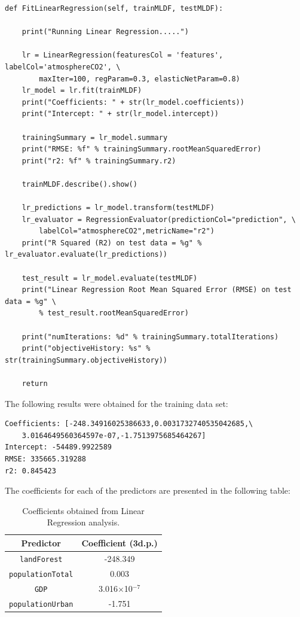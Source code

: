 \documentclass[11pt,a4paper,titlepage]{article}
\begin{document}
\begin{verbatim}
def FitLinearRegression(self, trainMLDF, testMLDF):

    print("Running Linear Regression.....")

    lr = LinearRegression(featuresCol = 'features', labelCol='atmosphereCO2', \
        maxIter=100, regParam=0.3, elasticNetParam=0.8)
    lr_model = lr.fit(trainMLDF)
    print("Coefficients: " + str(lr_model.coefficients))
    print("Intercept: " + str(lr_model.intercept))

    trainingSummary = lr_model.summary
    print("RMSE: %f" % trainingSummary.rootMeanSquaredError)
    print("r2: %f" % trainingSummary.r2)

    trainMLDF.describe().show()

    lr_predictions = lr_model.transform(testMLDF)
    lr_evaluator = RegressionEvaluator(predictionCol="prediction", \
        labelCol="atmosphereCO2",metricName="r2")
    print("R Squared (R2) on test data = %g" % lr_evaluator.evaluate(lr_predictions))

    test_result = lr_model.evaluate(testMLDF)
    print("Linear Regression Root Mean Squared Error (RMSE) on test data = %g" \
        % test_result.rootMeanSquaredError)

    print("numIterations: %d" % trainingSummary.totalIterations)
    print("objectiveHistory: %s" % str(trainingSummary.objectiveHistory))

    return
\end{verbatim}

The following results were obtained for the training data set:

\begin{verbatim}
Coefficients: [-248.34916025386633,0.0031732740535042685,\
    3.0164649560364597e-07,-1.7513975685464267]
Intercept: -54489.9922589
RMSE: 335665.319288
r2: 0.845423
\end{verbatim}

The coefficients for each of the predictors are presented in the following table:

\begin{table}[htbp!]
    \begin{center}
        \begin{tabular}{ |c|c| } 
        \hline
        Predictor & Coefficient (3d.p.) \\ 
        \hline
        \texttt{landForest} & -248.349\\
        \texttt{populationTotal} & 0.003 \\
        \texttt{GDP} & 3.016$\times$10$^{-7}$ \\
        \texttt{populationUrban} & -1.751 \\
        \hline
        \end{tabular}
        \caption{Coefficients obtained from Linear Regression analysis.}
        \label{LinearRegressionCoeffs}
    \end{center}
\end{table}
\end{document}
